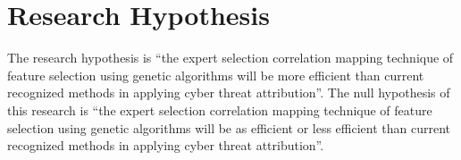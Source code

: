 \documentclass[12pt]{report}
\begin{document}

\section{Research Hypothesis} 
The research hypothesis is ``the expert selection correlation mapping technique of feature selection using genetic algorithms will be more efficient than current recognized methods in applying cyber threat attribution''. The null hypothesis of this research is ``the expert selection correlation mapping technique of feature selection using genetic algorithms will be as efficient or less efficient than current recognized methods in applying cyber threat attribution''.
\end{document}

